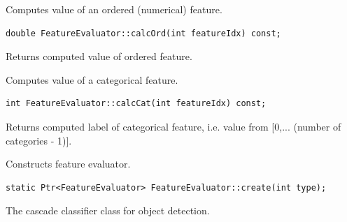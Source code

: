 Computes value of an ordered (numerical) feature.

\begin{lstlisting}
double FeatureEvaluator::calcOrd(int featureIdx) const;
\end{lstlisting}

\begin{description}
\end{description}
Returns computed value of ordered feature.

Computes value of a categorical feature.

\begin{lstlisting}
int FeatureEvaluator::calcCat(int featureIdx) const;
\end{lstlisting}

\begin{description}
\end{description}
Returns computed label of categorical feature, i.e. value from [0,... (number of categories - 1)].

Constructs feature evaluator.

\begin{lstlisting}
static Ptr<FeatureEvaluator> FeatureEvaluator::create(int type);
\end{lstlisting}

\begin{description}
\end{description}

The cascade classifier class for object detection.

